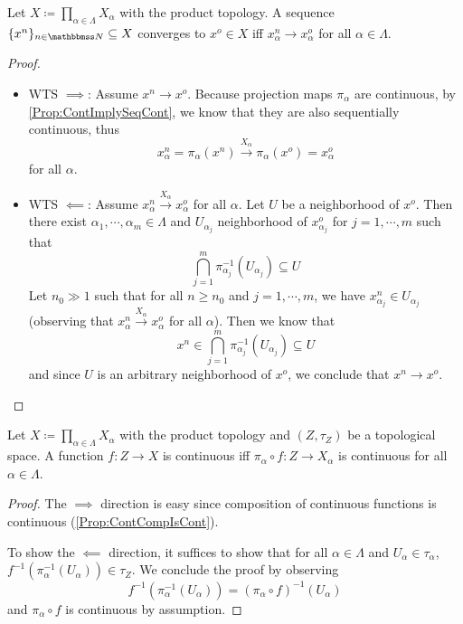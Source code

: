 \documentclass[screen,single]{techreport}
\numberwithin{equation}{section}
\begin{document}
\begin{lemma}\label{Lem:ProdTopSeqConvergeIffEveryAxisConverge}
	Let $X \coloneqq \prod_{\alpha \in \Lambda} X_\alpha$ with the product topology.
	A sequence $\{x^n\}_{n \in \bbN} \subseteq X$ converges to $x^o \in X$ iff $x^n_\alpha \rightarrow x^o_\alpha$ for all $\alpha \in \Lambda$.
\end{lemma}
\begin{proof}\
	\begin{itemize}
		\item WTS $\implies$: Assume $x^n \rightarrow x^o$.
		Because projection maps $\pi_\alpha$ are continuous, by \cref{Prop:ContImplySeqCont}, we know that they are also sequentially continuous, thus
		\[
		x^n_\alpha = \pi_\alpha(x^n) \xrightarrow{X_\alpha} \pi_\alpha(x^o) = x^o_\alpha
		\]
		for all $\alpha$.
		
		\item WTS $\impliedby$: Assume $x^n_\alpha \xrightarrow{X_\alpha} x^o_\alpha$ for all $\alpha$.
		Let $U$ be a neighborhood of $x^o$.
		Then there exist $\alpha_1,\cdots,\alpha_m \in \Lambda$ and  $U_{\alpha_j}$ neighborhood of $x^o_{\alpha_j}$ for $j=1,\cdots,m$ such that
		\[
		\bigcap_{j=1}^m \pi_{\alpha_j}^{-1}(U_{\alpha_j}) \subseteq U
		\]
		Let $n_0 \gg 1$ such that for all $n \ge n_0$ and $j=1,\cdots,m$, we have $x^n_{\alpha_j} \in U_{\alpha_j}$ (observing that $x^n_\alpha \xrightarrow{X_\alpha} x^o_\alpha$ for all $\alpha$).
		Then we know that
		\[
		x^n \in \bigcap_{j=1}^m \pi_{\alpha_j}^{-1}(U_{\alpha_j}) \subseteq U
		\]
		and since $U$ is an arbitrary neighborhood of $x^o$, we conclude that $x^n \rightarrow x^o$.
	\end{itemize}
\end{proof}

\begin{lemma}\label{Lem:ProdTopContFuncIffContEveryAxis}
	Let $X \coloneqq \prod_{\alpha \in \Lambda} X_\alpha$ with the product topology and $(Z,\tau_Z)$ be a topological space.
	A function $f :Z \to X$ is continuous iff $\pi_\alpha \circ f : Z \to X_\alpha$ is continuous for all $\alpha \in \Lambda$.
\end{lemma}
\begin{proof}
	The $\implies$ direction is easy since composition of continuous functions is continuous (\cref{Prop:ContCompIsCont}).
	
	To show the $\impliedby$ direction, it suffices to show that for all $\alpha \in \Lambda$ and $U_\alpha \in \tau_\alpha$, $f^{-1}(\pi_\alpha^{-1}(U_\alpha)) \in \tau_Z$.
	We conclude the proof by observing
	\[
	f^{-1}(\pi_\alpha^{-1}(U_\alpha)) = (\pi_\alpha \circ f)^{-1}(U_\alpha)
	\]
	and $\pi_\alpha \circ f$ is continuous by assumption.
\end{proof}
\end{document}
